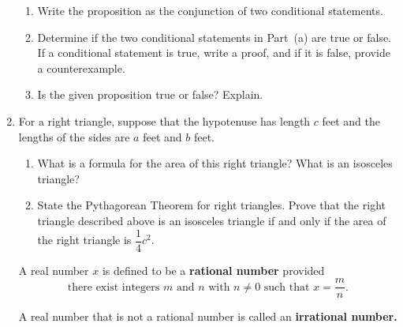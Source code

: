 \begin{enumerate}
\begin{enumerate}
\item Write the proposition as the conjunction of two conditional statements.
\item Determine if the two conditional statements in Part~(a) are true or false.  If a conditional statement is true, write a proof, and if it is false, provide a counterexample.
\item Is the given proposition true or false?  Explain.
\end{enumerate}


\item For a right triangle, suppose that the hypotenuse has length $c$ feet and the lengths of the sides are $a$ feet and $b$ feet.
\label{exer:sec32-6}%
  \begin{enumerate}
    \item What is a formula for the area of this right triangle?  What is an isosceles triangle?
    \item State the Pythagorean Theorem for right triangles.
    \yitem Prove that the right triangle described above is an isosceles triangle if and only if the area of the right triangle is $\dfrac{1}{4} c^2$.
  \end{enumerate} 

%
%
%

\xitem A real number  $x$ is defined to be a \textbf{rational number} \label{exer:rational}
%
 provided 
\[
\text{there exist integers } m  \text{ and }  n  \text{ with }  n \ne 0  \text{ such that }  x = \frac{m}{n}.  
\]

A real number that is not a rational number is called an \textbf{irrational number.}
%


\end{enumerate}
